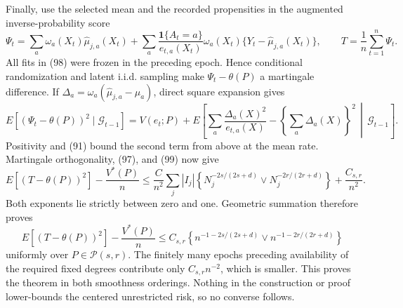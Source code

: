 Finally, use the selected mean and the recorded propensities in the augmented inverse-probability score
\[
\Psi_t=
\sum_a\omega_a(X_t)\widehat\mu_{j,a}(X_t)
+\sum_a\frac{\mathbf1\{A_t=a\}}{e_{t,a}(X_t)}
\omega_a(X_t)\{Y_t-\widehat\mu_{j,a}(X_t)\},
\qquad
T=\frac1n\sum_{t=1}^n\Psi_t.
\tag{98}
\]
All fits in (98) were frozen in the preceding epoch. Hence conditional randomization and latent i.i.d. sampling make \(\Psi_t-\theta(P)\) a martingale difference. If \(\Delta_a=\omega_a(\widehat\mu_{j,a}-\mu_a)\), direct square expansion gives
\[
E[(\Psi_t-\theta(P))^2\mid\mathcal G_{t-1}]
=V(e_t;P)+E\!\left[
\sum_a\frac{\Delta_a(X)^2}{e_{t,a}(X)}
-\left\{\sum_a\Delta_a(X)\right\}^2
\,\middle|\,\mathcal G_{t-1}\right].
\tag{99}
\]
Positivity and (91) bound the second term from above at the mean rate. Martingale orthogonality, (97), and (99) now give
\[
E[(T-\theta(P))^2]-\frac{V^*(P)}n
\leq\frac{C}{n^2}\sum_j|I_j|
\left\{N_j^{-2s/(2s+d)}\vee N_j^{-2r/(2r+d)}\right\}
+\frac{C_{s,r}}{n^2}.
\]
Both exponents lie strictly between zero and one. Geometric summation therefore proves
\[
E[(T-\theta(P))^2]-\frac{V^*(P)}n
\leq C_{s,r}\left\{
n^{-1-2s/(2s+d)}\vee n^{-1-2r/(2r+d)}
\right\}
\]
uniformly over \(P\in\mathcal P(s,r)\). The finitely many epochs preceding availability of the required fixed degrees contribute only \(C_{s,r}n^{-2}\), which is smaller. This proves the theorem in both smoothness orderings. Nothing in the construction or proof lower-bounds the centered unrestricted risk, so no converse follows.